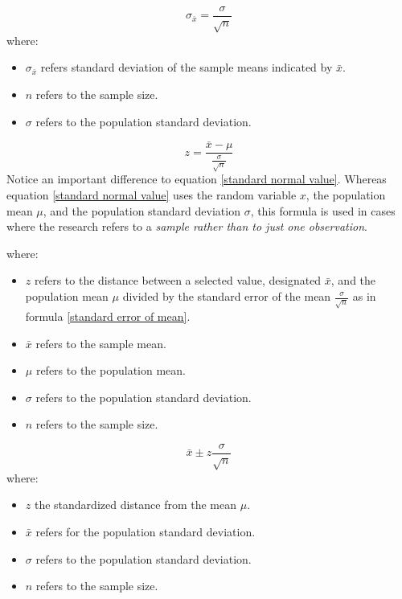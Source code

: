 \begin{equation}
\label{standard error of mean}
\sigma_{\bar{x}}=\frac{\sigma}{\sqrt{n}}
\end{equation}
where: 
\begin{itemize}
 \item $\sigma_{\bar{x}}$ refers standard deviation of the sample means indicated by $\bar{x}$.
 \item $n$ refers to the sample size.
 \item $\sigma$ refers to the population standard deviation. 
\end{itemize}
\hformbar


\begin{equation}
\label{z value of sample mean}
z = \frac{\bar{x}-\mu}{\frac{\sigma}{\sqrt{n}}}
\end{equation}
Notice an important difference to equation \eqref{standard normal value}. Whereas equation \eqref{standard normal value} uses the random variable $x$, the population mean $\mu$, and the population standard deviation $\sigma$, this formula is used in cases where the research refers to a \textit{sample rather than to just one observation}.

where: 
\begin{itemize}
 \item $z$ refers to the distance between a selected value, designated $\bar{x}$, and the population mean $\mu$ divided by the standard error of the mean $\frac{\sigma}{\sqrt{n}}$ as in formula \eqref{standard error of mean}.
 \item $\bar{x}$ refers to the sample mean.
 \item $\mu$ refers to the population mean.
 \item $\sigma$ refers to the population standard deviation.
 \item $n$ refers to the sample size. 
\end{itemize}
\hformbar


\begin{equation}
\label{Confidence interval for a population mean with sigma known}
\bar{x} \pm z\frac{\sigma}{\sqrt{n}}
\end{equation}
where: 
\begin{itemize}
 \item $z$ the standardized distance from the mean $\mu$.
 \item $\bar{x}$ refers for the population standard deviation.
 \item $\sigma$ refers to the population standard deviation.
 \item $n$ refers to the sample size. 
\end{itemize}
\hformbar



